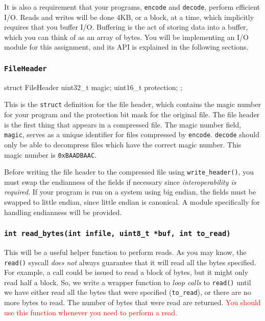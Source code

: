 \documentclass{article}
\begin{document}
It is also a requirement that your programs, \texttt{encode} and
\texttt{decode}, perform efficient I/O. Reads and writes will be done 4KB, or a
block, at a time, which implicitly requires that you buffer I/O. Buffering is
the act of storing data into a buffer, which you can think of as an array of
bytes. You will be implementing an I/O module for this assignment, and its
API is explained in the following sections.

\subsubsection{\texttt{FileHeader}}

\begin{codelisting}{}
struct FileHeader {
    uint32_t magic;
    uint16_t protection;
};
\end{codelisting}

This is the \texttt{struct} definition for the file header, which
contains the magic number for your program and the protection bit mask
for the original file.  The file header is the first thing that appears
in a compressed file. The magic number field, \texttt{magic}, serves as
a unique identifier for files compressed by \texttt{encode}.
\texttt{decode} should only be able to decompress files which have the
correct magic number. This magic number is \texttt{0xBAADBAAC}.

Before writing the file header to the compressed file using
\texttt{write\_header()}, you must swap the endianness of the fields if
necessary since \emph{interoperability is required}. If your program is
run on a system using big endian, the fields must be swapped to little
endian, since little endian is canonical. A module specifically for
handling endianness will be provided.

\subsubsection{\texttt{int read\_bytes(int infile, uint8\_t *buf, int
to\_read)}}

This will be a useful helper function to perform reads. As you may know,
the \texttt{read()} syscall \emph{does not} always guarantee that it
will read all the bytes specified. For example, a call could be issued
to read a block of bytes, but it might only read half a block. So, we
write a wrapper function to \emph{loop calls} to \texttt{read()} until
we have either read all the bytes that were specified
(\texttt{to\_read}), or there are no more bytes to read. The number of
bytes that were read are returned. \textcolor{red}{You should use this
function whenever you need to perform a read.}
\end{document}

